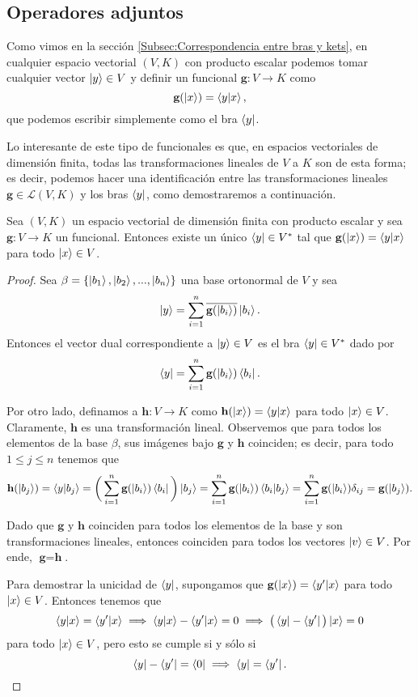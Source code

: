 \documentclass[12pt,dvipsnames]{article}
\newenvironment{teorema}[2][Teorema]{\begin{trivlist}
\item[\hskip \labelsep {\bfseries #1}\hskip \labelsep {\bfseries #2.}]}{\end{trivlist}}
\begin{document}
\subsection{Operadores adjuntos}

Como vimos en la sección \ref{Subsec:Correspondencia entre bras y kets}, en cualquier espacio vectorial $(V,K)$ con producto escalar podemos tomar cualquier vector $\ket{y}\in V$ y definir un funcional $\textbf{g}:V\to K$ como \[
    \textbf{g}(\ket{x})=\braket{y|x}
,\] que podemos escribir simplemente como el bra $\bra{y}$.

Lo interesante de este tipo de funcionales es que, en espacios vectoriales de dimensión finita, todas las transformaciones lineales de $V$ a $K$ son de esta forma; es decir, podemos hacer una identificación entre las transformaciones lineales $\textbf{g}\in\mathcal{L}(V,K)$ y los bras $\bra{y}$, como demostraremos a continuación.

\begin{teorema} {14.1}
    Sea $(V,K)$ un espacio vectorial de dimensión finita con producto escalar y sea $\textbf{g}:V\to K$ un funcional. Entonces existe un único $\bra{y}\in V^*$ tal que $\textbf{g}(\ket{x})=\braket{y|x}$ para todo $\ket{x}\in V$.

    \begin{proof}
        Sea $\beta=\{\ket{b_1},\ket{b_2},...,\ket{b_n}\}$ una base ortonormal de $V$ y sea \[
            \ket{y}=\sum_{i=1}^n \overline{\textbf{g}(\ket{b_i})}\ket{b_i} 
            .\] Entonces el vector dual correspondiente a $\ket{y}\in V$ es el bra $\bra{y}\in V^*$ dado por \[
            \bra{y}=\sum_{i=1}^n\textbf{g}(\ket{b_i})\bra{b_i}
        .\]  

        Por otro lado, definamos a $\textbf{h}:V\to K$ como $\textbf{h} (\ket{x})=\braket{y|x}$ para todo $\ket{x}\in V$. Claramente, $\textbf{h}$ es una transformación lineal. Observemos que para todos los elementos de la base $\beta$, sus imágenes bajo $\textbf{g}$ y $\textbf{h}$ coinciden; es decir, para todo $1\leq j\leq n$ tenemos que \[
            \textbf{h}(\ket{b_j})=\braket{y|b_j}=\bigg(\sum_{i=1}^n \textbf{g}(\ket{b_i})\bra{b_i}\bigg)\ket{b_j}=\sum_{i=1}^n \textbf{g}(\ket{b_i}) \braket{b_i|b_j}=\sum_{i=1}^n \textbf{g}(\ket{b_i})\delta_{ij}=\textbf{g}(\ket{b_j})
        .\] 

        Dado que $\textbf{g}$ y $\textbf{h}$ coinciden para todos los elementos de la base y son transformaciones lineales, entonces coinciden para todos los vectores $\ket{v}\in V$. Por ende, $\textbf{g}=\textbf{h}$. 

        Para demostrar la unicidad de $\bra{y}$, supongamos que $\textbf{g}(\ket{x})=\braket{y'|x}$ para todo $\ket{x}\in V$. Entonces tenemos que $$\braket{y|x}=\braket{y'|x} \implies \braket{y|x}-\braket{y'|x}=0 \implies \big(\bra{y}-\bra{y'}\big)\ket{x}=0$$ para todo $\ket{x}\in V$, pero esto se cumple si y sólo si $$\bra{y}-\bra{y'}=\bra{0}\implies \bra{y}=\bra{y'}.$$

    \end{proof}

\end{teorema}
\end{document}
